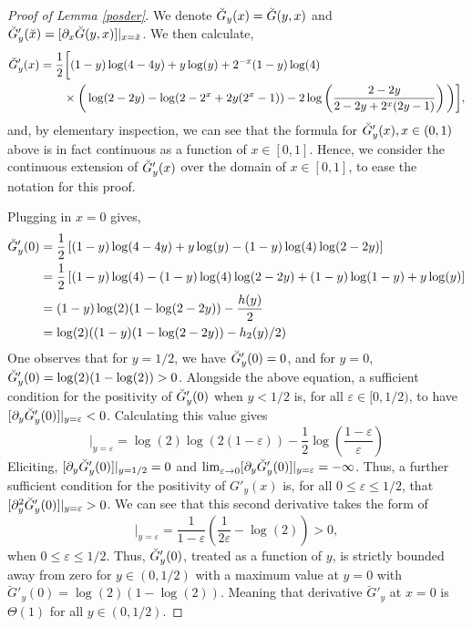 \documentclass[12pt,reqno]{amsart}
\numberwithin{equation}{section}
\theoremstyle{definition}
\renewcommand{\epsilon}{\varepsilon}
\newcommand{\conv}[1]{\overset{#1}{\rightarrow}}
\renewcommand{\[}{\begin{equation}}
\renewcommand{\]}{\end{equation}}
\renewcommand{\|}{\bigg{|}}
\begin{document}
\begin{proof}[Proof of Lemma \ref{posder}]
We denote $\Breve{G}_y(x) = \Breve{G}(y, x)$ and $\Breve{G}'_y(\Breve{x}) = [\partial_x \breve G(y,x)]|_{x = \Breve{x}}$. We then calculate,
    \[\begin{split}
        \Breve{G}'_y(x) &= \frac{1}{2}\bigg{[}(1-y)\log(4-4y) + y\log(y) + 2^{-x}(1-y)\log(4)\\
        &\qquad \times \bigg{(}\log(2-2y)-\log(2-2^x + 2y(2^x - 1)) -2\log\left( \frac{2-2y}{2-2y + 2^x(2y - 1)}\right)\bigg{)}\bigg{]},
    \end{split}\]
    and, by elementary inspection, we can see that the formula for $\Breve{G}_y'(x), x\in (0,1)$ above is in fact continuous as a function of $x \in [0,1].$ Hence, we consider the continuous extension of $\Breve{G}_y'(x)$ over the domain of $x \in [0,1]$, to ease the notation for this proof.
    
    Plugging in $x = 0$ gives,
   \begin{align}
   \Breve{G}'_y(0) &= \frac{1}{2}\left[(1-y)\log(4-4y) + y\log(y) - (1-y)\log(4)\log(2-2y)\right]\\
   &= \frac{1}{2}\left[(1-y)\log(4) - (1-y)\log(4)\log(2-2y) + (1-y)\log(1-y) + y\log(y)\right]\\
   &= (1-y)\log(2)(1-\log(2-2y)) - \frac{h(y)}{2}\\
   &= \log(2)((1-y)(1-\log(2-2y)) - h_2(y)/2)
   \end{align}
   One observes that for $y = 1/2$, we have $\Breve{G}'_y(0) = 0$,
   and for $y = 0$, $\Breve{G}'_y(0) = \log(2)(1-\log(2)) > 0$.
    Alongside the above equation, a sufficient condition for the positivity of $\Breve{G}'_y(0)$ when $y < 1/2$ is, for all $\epsilon \in [0,1/2)$, to have $[\partial_{y}\Breve{G}'_y(0)]|_{y = \epsilon} < 0$. Calculating this value gives
   \[[\partial_{y}\Breve{G}'_y(0)]|_{y = \epsilon} = \log(2)\log(2(1-\epsilon)) - \frac{1}{2}\log\left( \frac{1-\epsilon}{\epsilon}\right)\]
   Eliciting, $[\partial_{y}\Breve{G}'_y(0)]|_{y = 1/2} = 0$
   and $\lim_{\epsilon \conv{} 0}[\partial_{y}\Breve{G}'_y(0)]|_{y = \epsilon} = -\infty$. Thus, a further sufficient condition for the positivity of $G'_y(x)$ is, for all $0 \leq \epsilon \leq 1/2$, that $[\partial^2_{y}\Breve{G}'_y(0)]|_{y = \epsilon} > 0$.
   We can see that this second derivative takes the form of
   \[
       [\partial^2_{y}\Breve{G}'_y(0)]|_{y = \epsilon} = \frac{1}{1-\epsilon}\left( \frac{1}{2\epsilon} - \log(2)\right) > 0,
   \]
   when $0\leq \epsilon \leq 1/2 $. Thus, $\Breve{G}'_y(0)$, treated as a function of $y$, is strictly bounded away from zero for $y \in (0,1/2)$ with a maximum value at $y = 0$ with $\breve G'_y(0) = \log(2)(1-\log(2))$. Meaning that derivative $ \breve G'_y$ at $x=0$ is $\Theta(1)$ for all $y \in (0,1/2)$.
   

\end{proof}
\end{document}

